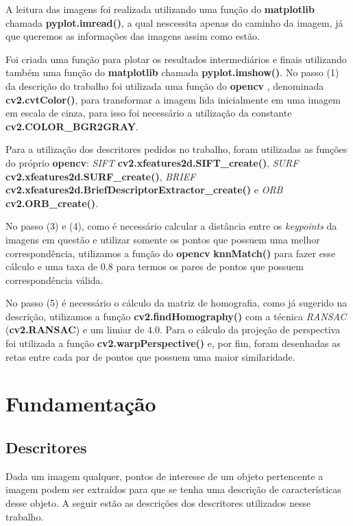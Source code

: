 \documentclass[twoside,twocolumn]{article}
\begin{document}
A leitura das imagens foi realizada utilizando uma função do \textbf{matplotlib} \cite{b3} chamada \textbf{pyplot.imread()}, a qual nescessita apenas do caminho da imagem, já que queremos as informações das imagens assim como estão.

Foi criada uma função para plotar os resultados intermediários e finais utilizando também uma função do \textbf{matplotlib} chamada \textbf{pyplot.imshow()}. No passo (1) da descrição do trabalho foi utilizada uma função do \textbf{opencv} \cite{b1}, denominada \textbf{cv2.cvtColor()}, para transformar a imagem lida inicialmente em uma imagem em escala de cinza, para isso foi necessário a utilização da constante \textbf{cv2.COLOR\_BGR2GRAY}.

Para a utilização dos descritores pedidos no trabalho, foram utilizadas as funções do próprio \textbf{opencv}: \textit{SIFT} \textbf{cv2.xfeatures2d.SIFT\_create()}, \textit{SURF} \textbf{cv2.xfeatures2d.SURF\_create()}, \textit{BRIEF} \textbf{cv2.xfeatures2d.BriefDescriptorExtractor\_create()} e \textit{ORB} \textbf{cv2.ORB\_create()}.

No passo (3) e (4), como é necessário calcular a distância entre os \textit{keypoints} da imagens em questão e  utilizar somente os pontos que possuem uma melhor correspondência, utilizamos a função do \textbf{opencv} \textbf{knnMatch()} para fazer esse cálculo e uma taxa de $0.8$ para termos os pares de pontos que possuem correspondência válida.

No passo (5) é necessário o cálculo da matriz de homografia, como já sugerido na descrição, utilizamos a função \textbf{cv2.findHomography()} com a técnica \textit{RANSAC} (\textbf{cv2.RANSAC}) e um limiar de $4.0$. Para o cálculo da projeção de perspectiva foi utilizada a função \textbf{cv2.warpPerspective()} e, por fim, foram desenhadas as retas entre cada par de pontos que possuem uma maior similaridade.



\section{Fundamentação}

\subsection{Descritores}

Dada um imagem qualquer, pontos de interesse de um objeto pertencente a imagem podem ser extraídos para que se tenha uma descrição de características desse objeto. A seguir estão as descrições dos descritores utilizados nesse trabalho.
\end{document}
